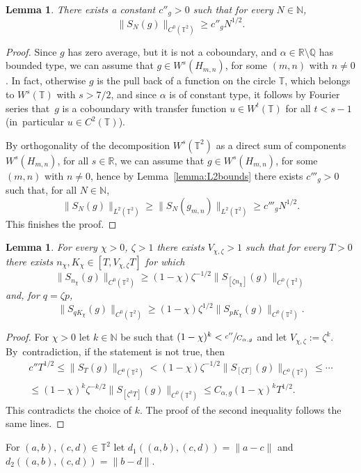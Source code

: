 \documentclass[10pt]{amsart}
\theoremstyle{definition}
\theoremstyle{plain}
\newtheorem{lemma}[definition]{Lemma}
\newcommand\NN{\mathbb{N}}
\newcommand\QQ{\mathbb{Q}}
\newcommand\RR{\mathbb{R}}
\newcommand\TT{\mathbb{T}}
\begin{document}
\begin{lemma}\label{lem:gro} There exists a constant $c''_g>0$ such that for every $N\in \NN$,
\[
\|S_{N}(g)\|_{C^0(\TT^2)}\geq c''_g N^{1/2}.
\]
\end{lemma}
\begin{proof}
Since $g$ has zero average, but it is not a coboundary, and $\alpha\in \RR\setminus \QQ$ has bounded type, we can assume that $g\in W^s(H_{m,n})$, for some
$(m,n)$ with $n\neq 0$. In fact, otherwise $g$ is the pull back of a function on the circle $\TT$, which belongs to $W^s(\TT)$ with $s> 7/2$, and since $\alpha$ is of constant
type, it follows by Fourier series that~$g$ is a coboundary with transfer function $u \in W^t(\TT)$ for all $t<s-1$ (in~particular $u\in C^2(\TT)$).

By orthogonality of the decomposition $W^s(\TT^2)$ as a direct sum of components $W^s(H_{m,n})$, for all $s\in \RR$, we can assume that $g\in W^s(H_{m,n})$, for some
$(m,n)$ with $n\neq 0$, hence by Lemma~\ref{lemma:L2bounds} there exists $c'''_g >0$ such that, for all $N\in \NN$,
\[
\|S_{N}(g)\|_{L^2(\TT^2)}\geq \|S_{N}(g_{m,n})\|_{L^2(\TT^2)} \geq c'''_gN^{1/2}.
\]
This finishes the proof.
\end{proof}

\begin{lemma}\label{lem:supr} For every $\chi>0$, $\zeta>1$ there exists $V_{\chi,\zeta}>1$ such that for every $T>0$ there exists $n_\chi,K_\chi\in [T,V_{\chi,\zeta} T]$ for which
\[
\|S_{n_\chi}(g)\|_{C^0(\TT^2)}\geq (1-\chi)\zeta^{-1/2}\|S_{[\zeta n_\chi]}(g)\|_{C^0(\TT^2)}
\]
and, for $q=\zeta p $,
\[
\|S_{qK_\chi}(g)\|_{C^0(\TT^2)}\geq (1-\chi)\zeta^{1/2}\|S_{ pK_\chi}(g)\|_{C^0(\TT^2)}.
\]
\end{lemma}
\begin{proof} For $\chi>0$ let $k\in \NN$ be such that $(1-\chi)^k< \sfrac{c''}{C_{\alpha,g}}$ and let $V_{\chi,\zeta}:=\zeta^k$.
By~contradiction, if the statement is not true, then
\begin{multline*}
c'' T^{1/2}\leq \|S_{T}(g)\|_{C^0(\TT^2)}<(1-\chi)\zeta^{-1/2}\|S_{[\zeta T]}(g)\|_{C^0(\TT^2)}\leq
\cdots\\
\leq
(1-\chi)^k\zeta^{-k/2}\|S_{[\zeta^k T]}(g)\|_{C^0(\TT^2)}\leq C_{\alpha,g}(1-\chi)^kT^{1/2}.
\end{multline*}
This contradicts the choice of $k$. The proof of the second inequality follows the same lines.
\end{proof}

For $(a,b),(c,d)\in \TT^2$ let $d_1((a,b),(c,d))=\|a-c\|$ and $d_2((a,b),(c,d))=\|b-d\|$.
\end{document}
